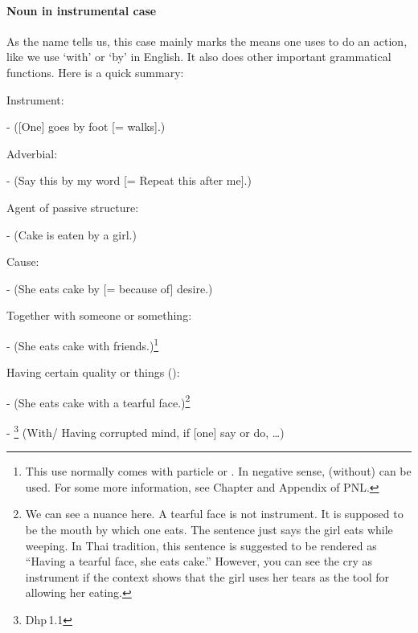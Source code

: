 \paragraph*{Noun in instrumental case} As the name tells us, this case mainly marks the means one uses to do an action, like we use `with' or `by' in English. It also does other important grammatical functions. Here is a quick summary:
\begin{compactenum}[(1)]
\item Instrument:\par
-  ([One] goes by foot [= walks].)\par
\item Adverbial:\par
-  (Say this by my word [= Repeat this after me].)\par
\item Agent of passive structure:\par
-  (Cake is eaten by a girl.)\par
\item Cause:\par
-  (She eats cake by [= because of] desire.)\par
\item Together with someone or something:\par
-  (She eats cake with friends.)\footnote{This use normally comes with particle  or . In negative sense,  (without) can be used. For some more information, see Chapter  and Appendix  of PNL.}\par
\item Having certain quality or things ():\par
-  (She eats cake with a tearful face.)\footnote{We can see a nuance here. A tearful face is not instrument. It is supposed to be the mouth by which one eats. The sentence just says the girl eats while weeping. In Thai tradition, this sentence is suggested to be rendered as ``Having a tearful face, she eats cake.'' However, you can see the cry as instrument if the context shows that the girl uses her tears as the tool for allowing her eating.}\par
- \footnote{Dhp\,1.1} (With/ Having corrupted mind, if [one] say or do, \ldots)\par

\end{compactenum}
